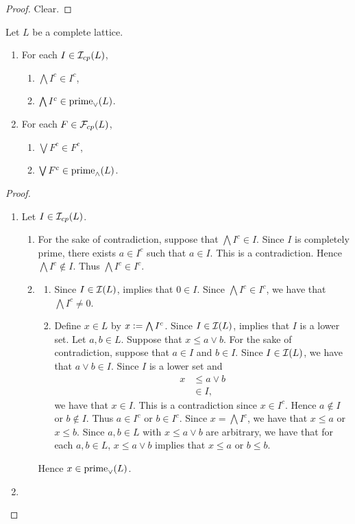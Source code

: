 \documentclass{book}
\begin{document}
	\begin{proof}
		Clear. 
	\end{proof}
	
	\begin{ex}
		Let $L$ be a complete lattice.
		\begin{enumerate}
			\item For each $I \in \mathcal{I}_{cp}(L)$,
			\begin{enumerate}
				\item $\bigwedge I^c \in I^c$,
				\item $\bigwedge I^c \in \operatorname*{\text{prime}_{\vee}}(L)$.
			\end{enumerate}
			\item For each $F \in \mathcal{F}_{cp}(L)$,
			\begin{enumerate}
				\item $\bigvee F^c \in F^c$,
				\item $\bigvee F^c \in \operatorname*{\text{prime}_{\wedge}}(L)$.
			\end{enumerate}
		\end{enumerate}
	\end{ex}
	
	\begin{proof}\
		\begin{enumerate}
			\item Let $I \in \mathcal{I}_{cp}(L)$. 
			\begin{enumerate}
				\item For the sake of contradiction, suppose that $\bigwedge I^c \in I$. Since $I$ is completely prime, there exists $a \in I^c$ such that $a \in I$. This is a contradiction. Hence $\bigwedge I^c \not \in I$. Thus $\bigwedge I^c \in I^c$. 
				\item 
				\begin{enumerate}
					\item Since $I \in \mathcal{I}(L)$,  implies that $0 \in I$. Since $\bigwedge I^c \in I^c$, we have that $\bigwedge I^c \neq 0$. 
					\item Define $x \in L$ by $x \vcentcolon= \bigwedge I^c$. Since $I \in \mathcal{I}(L)$, \tcr{a prev ex} implies that $I$ is a lower set. Let $a,b \in L$. Suppose that $x \leq a \vee b$. For the sake of contradiction, suppose that $a \in I$ and $b \in I$. Since $I \in \mathcal{I}(L)$, we have that $a \vee b \in I$. Since $I$ is a lower set and 
					\begin{align*}
						x
						& \leq a \vee b \\
						& \in I,
					\end{align*}
					we have that $x \in I$. This is a contradiction since $x \in I^c$. Hence $a \not \in I$ or $b \not \in I$. Thus $a \in I^c$ or $b \in I^c$. Since $x = \bigwedge I^c$, we have that $x \leq a$ or $x \leq b$. Since $a,b \in L$ with $x \leq a \vee b$ are arbitrary, we have that for each $a,b \in L$, $x \leq a \vee b$ implies that $x \leq a$ or $b \leq b$.
				\end{enumerate}
				Hence $x \in \operatorname*{\text{prime}_{\vee}}(L)$.
			\end{enumerate} 
			\item {}
		\end{enumerate}
	\end{proof}
	
\end{document}
